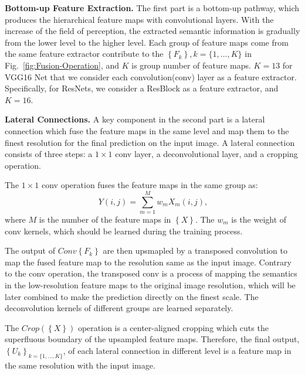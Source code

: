 \noindent\textbf{Bottom-up Feature Extraction.} The first part is a bottom-up pathway, which produces the hierarchical feature maps with convolutional layers.
%
With the increase of the field of perception, the extracted semantic information is gradually from the lower level to the higher level.
Each group of feature maps come from the same feature extractor contribute to the $\left\{F_{k}\right\},k=\{1,\ldots,K\}$ in Fig.~\ref{fig:Fusion-Operation}, and ${K}$ is group number of feature maps.
${K}=13$ for VGG16 Net that we consider each convolution(conv) layer as a feature extractor.
Specifically, for ResNets, we consider a ResBlock as a feature extractor, and ${K}=16$.

\noindent\textbf{Lateral Connections.} A key component in the second part is a lateral connection which fuse the feature maps in the same level and map them to the finest resolution for the final prediction on the input image.
%
A lateral connection consists of three steps: a ${1\times1}$ conv layer, a deconvolutional layer, and a cropping operation.


The ${1\times1}$ conv operation fuses the feature maps in the same group as:
\begin{equation}
    \label{Conv}
    \ Y(i,j)=\sum_{m=1}^{M}w_{m}X_{m}(i,j),
\end{equation}
%
where ${M}$ is the number of the feature maps in ${\left\{X\right\}}$. The ${w_{m}}$ is the weight of conv kernels, which should be learned during the training process.

The output of ${Conv\left\{F_{k}\right\}}$ are then upsmapled by a transposed convolution to map the fused feature map to the resolution same as the input image.
Contrary to the conv operation, the transposed conv is a process of mapping the semantics in the low-resolution feature maps to the original image resolution, which will be later combined to make the prediction directly on the finest scale.
The deconvolution kernels of different groups are learned separately.

%
The ${Crop(\left\{X \right\})}$ operation is a center-aligned cropping which cuts the superfluous boundary of the upsampled feature maps.
Therefore, the final output, $\left\{U_k\right\}_{k=\{1,\ldots,K\}}$, of each lateral connection in different level is a feature map in the same resolution with the input image.


